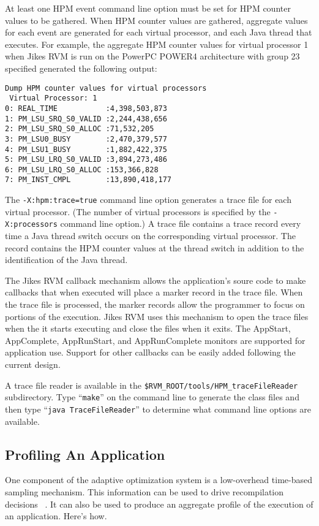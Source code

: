 At least one HPM event command line option must be set for HPM counter values to be gathered.  
When HPM counter values are gathered, aggregate values for each event 
are generated for each virtual processor, and each Java\TMweb{} thread that executes.
For example, the aggregate HPM counter values for virtual processor 1
when Jikes RVM is run on the PowerPC\TMweb{} POWER4 architecture with group 23 
specified generated the following output:

\begin{verbatim}
Dump HPM counter values for virtual processors
 Virtual Processor: 1
0: REAL_TIME           :4,398,503,873
1: PM_LSU_SRQ_S0_VALID :2,244,438,656
2: PM_LSU_SRQ_S0_ALLOC :71,532,205
3: PM_LSU0_BUSY        :2,470,379,577
4: PM_LSU1_BUSY        :1,882,422,375
5: PM_LSU_LRQ_S0_VALID :3,894,273,486
6: PM_LSU_LRQ_S0_ALLOC :153,366,828
7: PM_INST_CMPL        :13,890,418,177
\end{verbatim}

The {\tt -X:hpm:trace=true} command line option generates a trace file for each 
virtual processor. 
(The number of virtual processors is specified by the {\tt -X:processors} command line option.)
A trace file contains a trace record every time a Java thread switch occurs on the 
corresponding virtual processor.
The record contains the HPM counter values at the thread switch in addition to 
the identification of the Java thread.

The Jikes RVM callback mechanism allows the application's soure code 
to make callbacks that when executed will place a marker record in the trace file.
When the trace file is processed, the marker records allow the
programmer to focus on portions of the execution.
Jikes RVM uses this mechanism to open the trace files
when the it starts executing and close the files when it exits.
The AppStart, AppComplete, AppRunStart, and AppRunComplete monitors
are supported for application use.  
Support for other callbacks can be easily added following the current design.

A trace file reader is available in the {\tt \$RVM\_\-ROOT/tools/HPM\_\-trace\-Fi\-le\-Rea\-der}
subdirectory.  Type ``{\tt make}'' on the command line to generate the class files and then 
type ``{\tt java Trace\-Fi\-le\-Rea\-der}'' to determine what command line options are available.


\subsection{Profiling An Application}
One component of the adaptive optimization system is a low-overhead
time-based sampling mechanism.  This information can be used to drive
recompilation decisions
\T~\cite{jalapeno-adaptive-00}.
It can also be used to produce an aggregate
profile of the execution of an application.  
Here's how.

